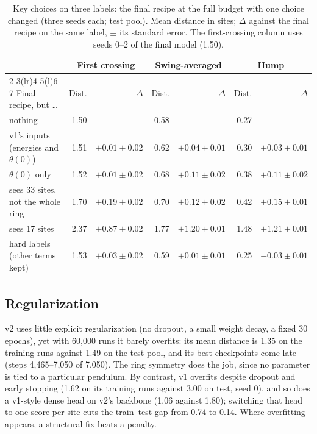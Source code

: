 \documentclass[11pt]{article}
\begin{document}
\begin{table}[htbp]
  \centering
  \caption{Key choices on three labels: the final recipe at the full budget with one choice changed (three seeds each; test pool). Mean distance in sites; $\Delta$ against the final recipe on the same label, $\pm$ its standard error. The first-crossing column uses seeds 0--2 of the final model (1.50).}
  \label{tab:choices}
  \small
  \begin{tabular}{@{}lrrrrrr@{}}
    \toprule
    & \multicolumn{2}{c}{First crossing} & \multicolumn{2}{c}{Swing-averaged} & \multicolumn{2}{c}{Hump} \\
    \cmidrule(lr){2-3}\cmidrule(lr){4-5}\cmidrule(l){6-7}
    Final recipe, but \dots & Dist. & $\Delta$ & Dist. & $\Delta$ & Dist. & $\Delta$ \\
    \midrule
    nothing & 1.50 & & 0.58 & & 0.27 & \\
    v1's inputs (energies and $\theta(0)$) & 1.51 & $+0.01\pm0.02$ & 0.62 & $+0.04\pm0.01$ & 0.30 & $+0.03\pm0.01$ \\
    $\theta(0)$ only & 1.52 & $+0.01\pm0.02$ & 0.68 & $+0.11\pm0.02$ & 0.38 & $+0.11\pm0.02$ \\
    sees 33 sites, not the whole ring & 1.70 & $+0.19\pm0.02$ & 0.70 & $+0.12\pm0.02$ & 0.42 & $+0.15\pm0.01$ \\
    sees 17 sites & 2.37 & $+0.87\pm0.02$ & 1.77 & $+1.20\pm0.01$ & 1.48 & $+1.21\pm0.01$ \\
    hard labels (other terms kept) & 1.53 & $+0.03\pm0.02$ & 0.59 & $+0.01\pm0.01$ & 0.25 & $-0.03\pm0.01$ \\
    \bottomrule
  \end{tabular}
\end{table}

\subsection{Regularization}
\label{sec:reg}

v2 uses little explicit regularization (no dropout, a small weight decay, a fixed 30 epochs), yet with 60,000 runs it barely overfits: its mean distance is 1.35 on the training runs against 1.49 on the test pool, and its best checkpoints come late (steps 4,465--7,050 of 7,050). The ring symmetry does the job, since no parameter is tied to a particular pendulum. By contrast, v1 overfits despite dropout and early stopping (1.62 on its training runs against 3.00 on test, seed 0), and so does a v1-style dense head on v2's backbone (1.06 against 1.80); switching that head to one score per site cuts the train--test gap from 0.74 to 0.14. Where overfitting appears, a structural fix beats a penalty.
\end{document}
